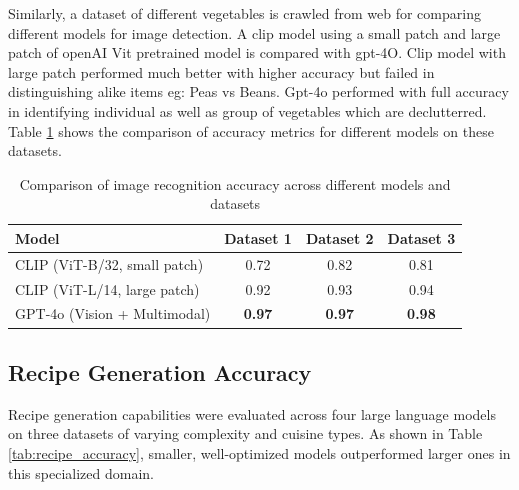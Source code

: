 \documentclass{ecai}
\begin{document}
Similarly, a dataset of different vegetables is crawled from web for comparing different models for image detection. A clip model using a small patch and large patch of openAI Vit pretrained model is compared with gpt-4O.
Clip model with large patch performed much better with higher accuracy but failed in distinguishing alike items eg: Peas vs Beans. Gpt-4o performed with full accuracy in identifying individual as well as group of vegetables which are declutterred. Table \ref{tab:ocr_image_accuracy} shows the comparison of accuracy metrics for different models on these datasets.

\begin{table}[ht]
\centering
\begin{tabular}{|l|c|c|c|}
\hline
\textbf{Model} & \textbf{Dataset 1} & \textbf{Dataset 2} & \textbf{Dataset 3} \\
\hline
CLIP (ViT-B/32, small patch) & 0.72 & 0.82 & 0.81 \\
CLIP (ViT-L/14, large patch) & 0.92 & 0.93 & 0.94 \\
GPT-4o (Vision + Multimodal) & \textbf{0.97} & \textbf{0.97} & \textbf{0.98} \\
\hline
\end{tabular}
\caption{Comparison of image recognition accuracy across different models and datasets}
\label{tab:ocr_image_accuracy}
\end{table}

\subsection{Recipe Generation Accuracy}

Recipe generation capabilities were evaluated across four large language models on three datasets of varying complexity and cuisine types. As shown in Table \ref{tab:recipe_accuracy}, smaller, well-optimized models outperformed larger ones in this specialized domain.

\begin{table}[ht]
\centering
{}
\caption{Comparison of recipe generation accuracy across different LLMs and datasets}
\label{tab:recipe_accuracy}
\end{table}
\end{document}
